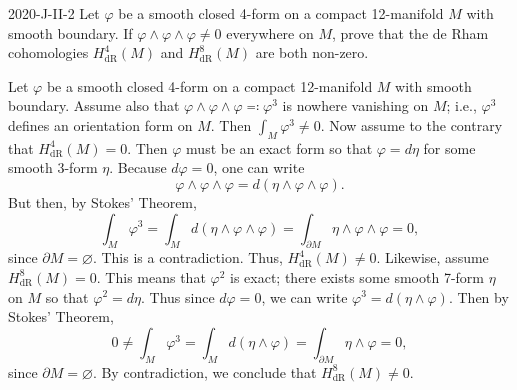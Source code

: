 \documentclass{article}
\begin{document}
	\begin{prb}{2020-J-II-2}
		Let $\varphi$ be a smooth closed 4-form on a compact 12-manifold $M$ with smooth boundary. If $\varphi \wedge \varphi \wedge \varphi \neq 0$ everywhere on $M$, prove that the de Rham cohomologies $H^{4}_{\text{dR}}(M)$ and $H^{8}_{\text{dR}}(M)$ are both non-zero. 
	\end{prb}
	Let $\varphi$ be a smooth closed 4-form on a compact 12-manifold $M$ with smooth boundary. Assume also that $\varphi \wedge \varphi \wedge \varphi \eqqcolon \varphi^{3}$ is nowhere vanishing on $M$; i.e., $\varphi^{3}$ defines an orientation form on $M$. Then $\int_{M}\varphi^{3} \neq 0$. Now assume to the contrary that $H^{4}_{\text{dR}}(M) = 0$. Then $\varphi$ must be an exact form so that $\varphi = d\eta$ for some smooth 3-form $\eta$. Because $d\varphi = 0$, one can write 
	\begin{equation*}
		\varphi \wedge \varphi \wedge \varphi = d(\eta \wedge \varphi \wedge \varphi). 
	\end{equation*}
	But then, by Stokes' Theorem, 
	\begin{equation*}
		\int_{M}\varphi^{3} = \int_{M}d(\eta \wedge \varphi \wedge \varphi) = \int_{\partial M}\eta \wedge \varphi \wedge \varphi = 0, 
	\end{equation*}
	since $\partial M= \varnothing$. This is a contradiction. Thus, $H^{4}_{\text{dR}}(M) \neq 0$. Likewise, assume $H^{8}_{\text{dR}}(M) = 0$. This means that $\varphi^{2}$ is exact; there exists some smooth 7-form $\eta$ on $M$ so that $\varphi^{2} = d\eta$. Thus since $d\varphi = 0$, we can write $\varphi^{3} = d(\eta \wedge \varphi)$. Then by Stokes' Theorem, 
	\begin{equation*}
		0 \neq \int_{M}\varphi^{3} = \int_{M}d(\eta \wedge \varphi) = \int_{\partial M}\eta \wedge \varphi = 0, 
	\end{equation*}
	since $\partial M = \varnothing$. By contradiction, we conclude that $H^{8}_{\text{dR}}(M) \neq 0$. 
	
\end{document}
